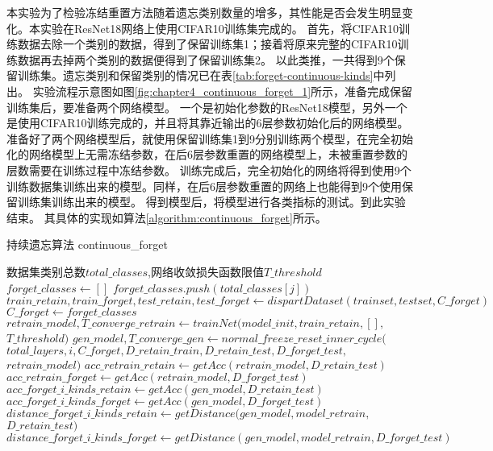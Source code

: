 本实验为了检验冻结重置方法随着遗忘类别数量的增多，其性能是否会发生明显变化。本实验在ResNet18网络上使用CIFAR10训练集完成的。
首先，将CIFAR10训练数据去除一个类别的数据，得到了保留训练集1；接着将原来完整的CIFAR10训练数据再去掉两个类别的数据便得到了保留训练集2。
以此类推，一共得到9个保留训练集。遗忘类别和保留类别的情况已在表\ref{tab:forget-continuous-kinds}中列出。
实验流程示意图如图\ref{fig:chapter4_continuous_forget_1}所示，准备完成保留训练集后，要准备两个网络模型。
一个是初始化参数的ResNet18模型，另外一个是使用CIFAR10训练完成的，并且将其靠近输出的6层参数初始化后的网络模型。
准备好了两个网络模型后，就使用保留训练集1到9分别训练两个模型，在完全初始化的网络模型上无需冻结参数，在后6层参数重置的网络模型上，未被重置参数的层数需要在训练过程中冻结参数。
训练完成后，完全初始化的网络将得到使用9个训练数据集训练出来的模型。同样，在后6层参数重置的网络上也能得到9个使用保留训练集训练出来的模型。
得到模型后，将模型进行各类指标的测试。到此实验结束。
其具体的实现如算法\ref{algorithm:continuous_forget}所示。
\begin{algorithm}
	\renewcommand{\algorithmicrequire}{\textbf{Input:}}
	\renewcommand{\algorithmicensure}{\textbf{Output:}}
	\caption{持续遗忘算法 continuous\_forget}
	\label{algorithm:continuous_forget}
	\begin{algorithmic}[1]
        \REQUIRE 数据集类别总数$total\_classes$,网络收敛损失函数限值$T\_threshold$
        \ENSURE  
            \STATE $forget\_classes \gets []$
                \STATE $forget\_classes.push(total\_classes[j])$
            \ENDFOR
            \STATE $train\_retain,train\_forget,test\_retain,test\_forget \gets dispartDataset(trainset, testset, C\_forget)$
            \STATE $C\_forget \gets forget\_classes$
            \STATE $retrain\_model,T\_converge\_retrain \gets trainNet(model\_init, train\_retain, [],$ \\ $ T\_threshold)$
            \STATE $gen\_model, T\_converge\_gen \gets normal\_freeze\_reset\_inner\_cycle($\\$total\_layers, i, C\_forget,D\_retain\_train,D\_retain\_test, D\_forget\_test,$\\$retrain\_model )$
            \STATE $acc\_retrain\_retain \gets getAcc(retrain\_model, D\_retain\_test)$
            \STATE $acc\_retrain\_forget  \gets getAcc(retrain\_model, D\_forget\_test)$
            \STATE $acc\_forget\_i\_kinds\_retain \gets getAcc(gen\_model, D\_retain\_test)$
            \STATE $acc\_forget\_i\_kinds\_forget  \gets getAcc(gen\_model, D\_forget\_test)$
            \STATE $distance\_forget\_i\_kinds\_retain \gets getDistance(gen\_model, model\_retrain,$\\$D\_retain\_test)$
            \STATE $distance\_forget\_i\_kinds\_forget \gets getDistance(gen\_model, model\_retrain, D\_forget\_test)$
        \ENDFOR
	\end{algorithmic}  
\end{algorithm}
